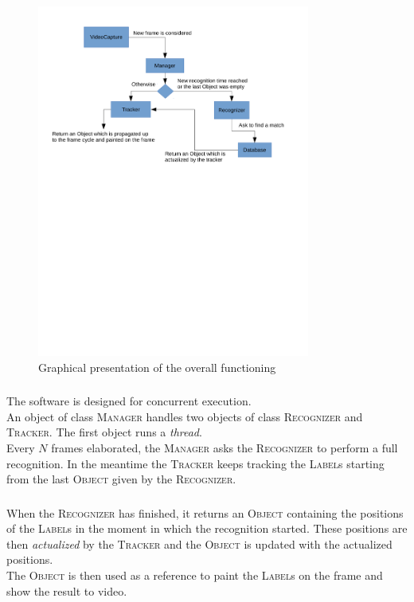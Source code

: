 \documentclass{beamer}
\begin{document}
  \begin{frame}
    \frametitle{\insertsection}
	\begin{figure}
		\centering
          \includegraphics[width=0.8\textwidth]{images/main_flow.pdf}
        \caption{Graphical presentation of the overall functioning
          \label{fig:overall}}
	\end{figure}
  \end{frame}

  \begin{frame}
    \frametitle{\insertsection}
    The software is designed for concurrent execution.\\
    An object of class \textsc{Manager} handles two objects of class
    \textsc{Recognizer} and \textsc{Tracker}. The first object runs a
    \emph{thread}.\\
    Every $N$ frames elaborated, the \textsc{Manager} asks the
    \textsc{Recognizer} to perform a full recognition. In the meantime the
    \textsc{Tracker} keeps tracking the \textsc{Label}s starting from the last
    \textsc{Object} given by the \textsc{Recognizer}.\\
  \end{frame}

  \begin{frame}
    \frametitle{\insertsection}
    When the \textsc{Recognizer} has finished, it returns an \textsc{Object}
    containing the positions of the \textsc{Label}s in the moment in which the
    recognition started. These positions are then \emph{actualized} by the
    \textsc{Tracker} and the \textsc{Object} is updated with the actualized
    positions.\\
	The \textsc{Object} is then used as a reference to paint the
    \textsc{Label}s on the frame and show the result to video.\\
  \end{frame}
\end{document}
